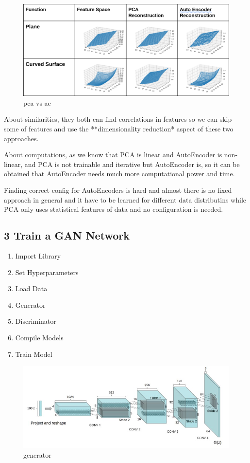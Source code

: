 \documentclass[11pt]{article}
\makeatletter
\def\maxwidth{\ifdim\Gin@nat@width>\linewidth\linewidth
    \else\Gin@nat@width\fi}
\let\Oldincludegraphics\includegraphics
\renewcommand{\includegraphics}[1]{\Oldincludegraphics[width=.8\maxwidth]{#1}}
\providecommand{\tightlist}{%
      \setlength{\itemsep}{0pt}\setlength{\parskip}{0pt}}
\makeatother
\begin{document}
\begin{figure}
\centering
\includegraphics{wiki/2_1.png}
\caption{pca vs ae}
\end{figure}

About similarities, they both can find correlations in features so we
can skip some of features and use the **dimensionality reduction* aspect
of these two approaches.

About computations, as we know that PCA is linear and AutoEncoder is
non-linear, and PCA is not trainable and iterative but AutoEncoder is,
so it can be obtained that AutoEncoder needs much more computational
power and time.

Finding correct config for AutoEncoders is hard and almost there is no
fixed approach in general and it have to be learned for different data
distributins while PCA only uses statistical features of data and no
configuration is needed.

    \hypertarget{train-a-gan-network}{%
\subsection{3 Train a GAN Network}\label{train-a-gan-network}}

\begin{enumerate}
\def\labelenumi{\arabic{enumi}.}
\tightlist
\item
  Import Library
\item
  Set Hyperparameters
\item
  Load Data
\item
  Generator
\item
  Discriminator
\item
  Compile Models
\item
  Train Model
\end{enumerate}

\begin{figure}
\centering
\includegraphics{wiki/3_1.jpg}
\caption{generator}
\end{figure}
\end{document}
